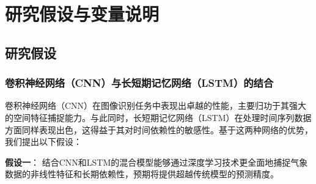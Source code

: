 \section{研究假设与变量说明}

\subsection{研究假设}

    
    
    


\subsubsection{卷积神经网络（CNN）与长短期记忆网络（LSTM）的结合}

卷积神经网络（CNN）在图像识别任务中表现出卓越的性能，主要归功于其强大的空间特征捕捉能力。与此同时，长短期记忆网络（LSTM）在处理时间序列数据方面同样表现出色，这得益于其对时间依赖性的敏感性。基于这两种网络的优势，我们提出以下假设：

\textbf{假设一}： 结合CNN和LSTM的混合模型能够通过深度学习技术更全面地捕捉气象数据的非线性特征和长期依赖性，预期将提供超越传统模型的预测精度。

